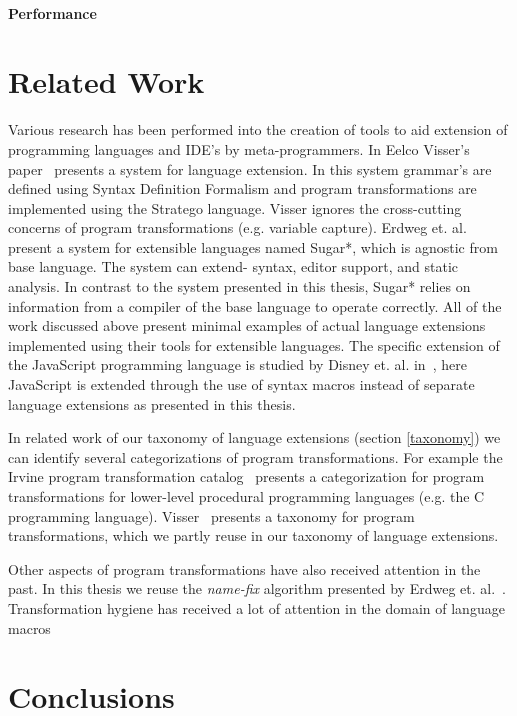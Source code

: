 \paragraph{Performance}

\section{Related Work}
Various research has been performed into the creation of tools to aid extension of programming languages and IDE's by meta-programmers. In Eelco Visser's paper~\cite{Visser20024} presents a system for language extension. In this system grammar's are defined using Syntax Definition Formalism and program transformations are implemented using the Stratego language. Visser ignores the cross-cutting concerns of program transformations (e.g. variable capture). Erdweg et. al.~\cite{Erdweg} present a system for extensible languages named Sugar*, which is agnostic from base language. The system can extend- syntax, editor support, and static analysis. In contrast to the system presented in this thesis, Sugar* relies on information from a compiler of the base language to operate correctly.  
All of the work discussed above present minimal examples of actual language extensions implemented using their tools for extensible languages. The specific extension of the JavaScript programming language is studied by Disney et. al. in~\cite{Disney2014}, here JavaScript is extended through the use of syntax macros instead of separate language extensions as presented in this thesis.

In related work of our taxonomy of language extensions (section \ref{taxonomy}) we can identify several categorizations of program transformations. For example the Irvine program transformation catalog~\cite{Standish1976a} presents a categorization for program transformations for lower-level procedural programming languages (e.g. the C programming language). Visser~\cite{Visser2001} presents a taxonomy for program transformations, which we partly reuse in our taxonomy of language extensions. 

Other aspects of program transformations have also received attention in the past. In this thesis we reuse the \textit{name-fix} algorithm presented by Erdweg et. al.~\cite{Erdweg2014}. Transformation hygiene has received a lot of attention in the domain of language macros~\cite{Kohlbecker1986,Herman2010a,Disney2014}

\section{Conclusions}
